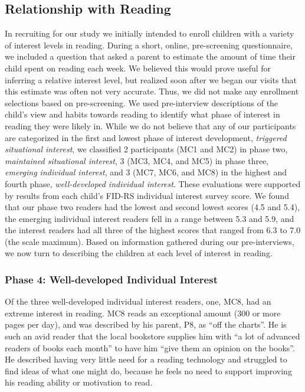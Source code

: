 \documentclass{sigchi}
\begin{document}
\subsection{Relationship with Reading}
In recruiting for our study we initially intended to enroll children with a variety of interest levels in reading. During a short, online, pre-screening questionnaire, we included a question that asked a parent to estimate the amount of time their child spent on reading each week. We believed this would prove useful for inferring a relative interest level, but realized soon after we began our visits that this estimate was often not very accurate. Thus, we did not make any enrollment selections based on pre-screening. We used pre-interview descriptions of the child's view and habits towards reading to identify what phase of interest in reading they were likely in. While we do not believe that any of our participants are categorized in the first and lowest phase of interest development, \textit{triggered situational interest}, we classified 2 participants (MC1 and MC2) in phase two, \textit{maintained situational interest}, 3 (MC3, MC4, and MC5) in phase three, \textit{emerging individual interest}, and 3 (MC7, MC6, and MC8) in the highest and fourth phase, \textit{well-developed individual interest}. These evaluations were supported by results from each child's FID-RS individual interest survey score. We found that our phase two readers had the lowest and second lowest scores (4.5 and 5.4), the emerging individual interest readers fell in a range between 5.3 and 5.9, and the interest readers had all three of the highest scores that ranged from 6.3 to 7.0 (the scale maximum). Based on information gathered during our pre-interviews, we now turn to describing the children at each level of interest in reading. 

\subsubsection{Phase 4: Well-developed Individual Interest}
Of the three well-developed individual interest readers, one, MC8, had an extreme interest in reading. MC8 reads an exceptional amount (300 or more pages per day), and was described by his parent, P8, as ``off the charts''. He is such an avid reader that the local bookstore supplies him with ``a lot of advanced readers of books each month'' to have him ``give them an opinion on the books''. He described having very little need for a reading technology and struggled to find ideas of what one might do, because he feels no need to support improving his reading ability or motivation to read.
\end{document}
